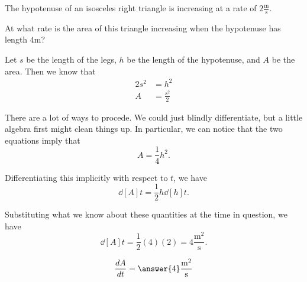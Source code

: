 \documentclass{ximera}
\author{Steven Gubkin}
\begin{document}
\begin{exercise}

The hypotenuse of an isosceles right triangle is increasing at a rate
of $2 \frac{\textrm{m}}{\textrm{s}}$.

At what rate is the area of this triangle increasing when the
hypotenuse has length $4 \textrm{m}$?

\begin{hint}
  Let $s$ be the length of the legs, $h$ be the length of the
  hypotenuse, and $A$ be the area.  Then we know that
\begin{align*}
	2s^2 &= h^2\\
	A &=\frac{s^2}{2}
\end{align*}
\end{hint}

\begin{hint}
  There are a lot of ways to procede.  We could just blindly
  differentiate, but a little algebra first might clean things up.  In
  particular, we can notice that the two equations imply that
\[
A = \frac{1}{4} h^2.
\]
\end{hint}

\begin{hint}
  Differentiating this implicitly with respect to $t$, we have
\[
\dd[A]{t} = \frac{1}{2} h \dd[h]{t}.
\]
\end{hint}

\begin{hint}
  Substituting what we know about these quantities at the time in
  question, we have
  \[
  \dd[A]{t} = \frac{1}{2} (4) (2) = 4\frac{\textrm{m}^2}{\textrm{s}}.
  \]
\end{hint}

\begin{prompt}
  \[
  \dd[A]{t} = \answer{4}\frac{\textrm{m}^2}{\textrm{s}}
  \]
\end{prompt}
\end{exercise}
\end{document}
